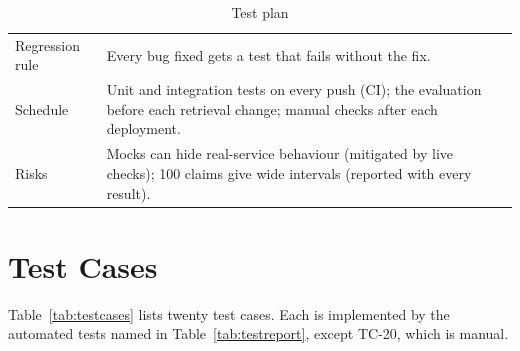 \begin{table}[H]
\begin{tabularx}{\textwidth}{>{\raggedright\arraybackslash}p{} L}
Regression rule & Every bug fixed gets a test that fails without the fix. \\
Schedule & Unit and integration tests on every push (CI); the evaluation before each retrieval change; manual checks after each deployment. \\
Risks & Mocks can hide real-service behaviour (mitigated by live checks); 100 claims give wide intervals (reported with every result). \\
\bottomrule
\end{tabularx}
\caption{Test plan}
\label{tab:testplan}
\end{table}

\section{Test Cases}

Table~\ref{tab:testcases} lists twenty test cases. Each is implemented by the
automated tests named in Table~\ref{tab:testreport}, except TC-20, which is
manual.

